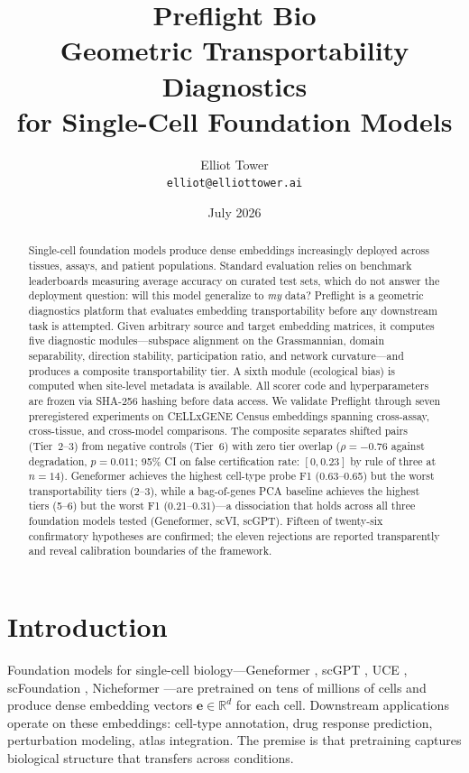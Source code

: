 \documentclass[11pt,letterpaper]{article}
\title{\textbf{Preflight Bio}\\[0.3em]
\large Geometric Transportability Diagnostics\\
for Single-Cell Foundation Models}
\author{Elliot Tower\\
\small\texttt{elliot@elliottower.ai}}
\date{July 2026}
\newcommand{\R}{\mathbb{R}}
\begin{document}
\maketitle
\thispagestyle{fancy}

\begin{abstract}
Single-cell foundation models produce dense embeddings increasingly deployed across tissues, assays, and patient populations. Standard evaluation relies on benchmark leaderboards measuring average accuracy on curated test sets, which do not answer the deployment question: will this model generalize to \emph{my} data?
Preflight is a geometric diagnostics platform that evaluates embedding transportability before any downstream task is attempted. Given arbitrary source and target embedding matrices, it computes five diagnostic modules---subspace alignment on the Grassmannian, domain separability, direction stability, participation ratio, and network curvature---and produces a composite transportability tier. A sixth module (ecological bias) is computed when site-level metadata is available. All scorer code and hyperparameters are frozen via SHA-256 hashing before data access.
We validate Preflight through seven preregistered experiments on CELLxGENE Census embeddings spanning cross-assay, cross-tissue, and cross-model comparisons. The composite separates shifted pairs (Tier~2--3) from negative controls (Tier~6) with zero tier overlap ($\rho = -0.76$ against degradation, $p = 0.011$; 95\% CI on false certification rate: $[0, 0.23]$ by rule of three at $n = 14$). Geneformer achieves the highest cell-type probe F1 (0.63--0.65) but the worst transportability tiers (2--3), while a bag-of-genes PCA baseline achieves the highest tiers (5--6) but the worst F1 (0.21--0.31)---a dissociation that holds across all three foundation models tested (Geneformer, scVI, scGPT). Fifteen of twenty-six confirmatory hypotheses are confirmed; the eleven rejections are reported transparently and reveal calibration boundaries of the framework.
\end{abstract}


\section{Introduction}
\label{sec:intro}

Foundation models for single-cell biology---Geneformer \citep{theodoris2023geneformer}, scGPT \citep{cui2024scgpt}, UCE \citep{rosen2026uce}, scFoundation \citep{hao2024scfoundation}, Nicheformer \citep{tejadalapuerta2025nicheformer}---are pretrained on tens of millions of cells and produce dense embedding vectors $\mathbf{e} \in \R^d$ for each cell. Downstream applications operate on these embeddings: cell-type annotation, drug response prediction, perturbation modeling, atlas integration. The premise is that pretraining captures biological structure that transfers across conditions.
\end{document}
